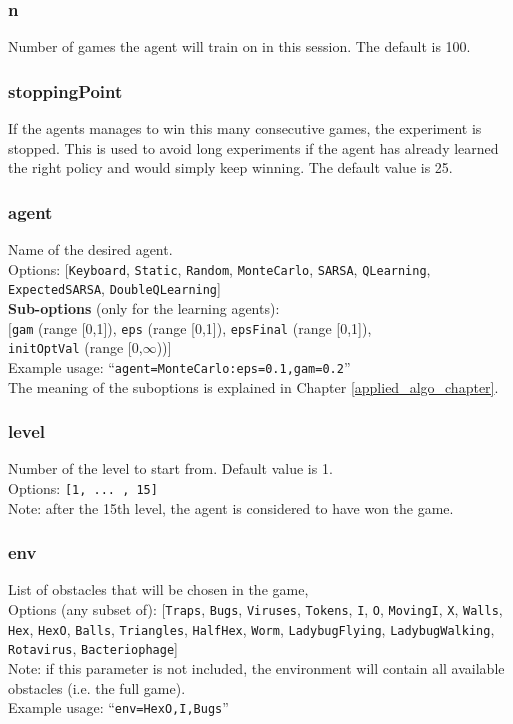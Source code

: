 \subsubsection*{n}
\label{opt:n}
Number of games the agent will train on in this session. The default is 100.

\subsubsection*{stoppingPoint}
\label{opt:stoppingPoint}
If the agents manages to win this many consecutive games, the experiment is stopped. This is used to avoid long experiments if the agent has already learned the right policy and would simply keep winning. The default value is 25.

\subsubsection*{agent}
\label{opt:agent}
Name of the desired agent. \\
Options: [\texttt{Keyboard}, \texttt{Static}, \texttt{Random}, \texttt{MonteCarlo}, \texttt{SARSA}, \texttt{QLearning}, \\ \texttt{ExpectedSARSA}, \texttt{DoubleQLearning}]\\
\textbf{Sub-options} (only for the learning agents):\\
$[$\texttt{gam} (range [0,1]), \texttt{eps} (range [0,1]), \texttt{epsFinal} (range [0,1]), \\ \texttt{initOptVal} (range [0,$\infty$))$]$\\
Example usage: ``\texttt{agent=MonteCarlo:eps=0.1,gam=0.2}''\\
The meaning of the suboptions is explained in Chapter \ref{applied_algo_chapter}.

\subsubsection*{level}
\label{opt:level}
Number of the level to start from. Default value is 1.\\
Options: \texttt{[1, ... , 15]}\\
Note: after the 15th level, the agent is considered to have won the game.

\subsubsection*{env}
\label{opt:env}
List of obstacles that will be chosen in the game,\\
Options (any subset of): [\texttt{Traps}, \texttt{Bugs}, \texttt{Viruses}, \texttt{Tokens},
\texttt{I}, \texttt{O}, \texttt{MovingI}, \texttt{X}, \texttt{Walls}, \texttt{Hex},
\texttt{HexO}, \texttt{Balls}, \texttt{Triangles}, \texttt{HalfHex},
\texttt{Worm}, \texttt{LadybugFlying}, \texttt{LadybugWalking},
\texttt{Rotavirus}, \texttt{Bacteriophage}]\\
Note: if this parameter is not included, the environment will contain all available obstacles (i.e. the full game).\\
Example usage: ``\texttt{env=HexO,I,Bugs}''\\

